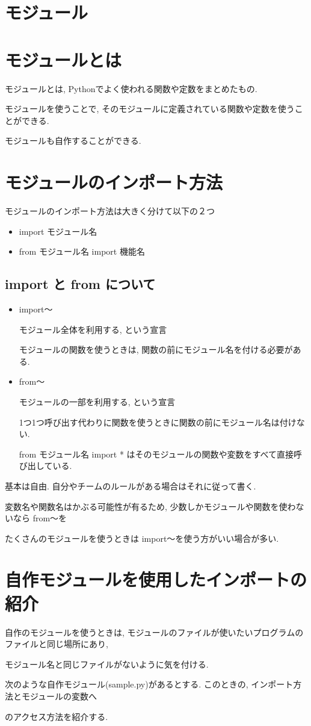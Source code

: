 \documentclass[dvipdfmx]{jsbook}
\newcommand{\countup}[1]{\setcounter{chapter}{#1} \setcounter{section}{0}}
\newcommand{\info}[2]{\begin{tcolorbox}[colframe=gray, colback=black!10!white, coltitle=white, fonttitle=\bfseries, title={#1}]
{#2}\end{tcolorbox}}
\begin{document}
\section*{モジュール}
\countup{10}
\section{モジュールとは}
モジュールとは, Pythonでよく使われる関数や定数をまとめたもの. \par
モジュールを使うことで, そのモジュールに定義されている関数や定数を使うことができる. \par
モジュールも自作することができる.
\section{モジュールのインポート方法}
モジュールのインポート方法は大きく分けて以下の２つ
\begin{itemize}
	\item{import モジュール名}
	\item{from モジュール名 import 機能名}
\end{itemize}
\subsection{import と from について}
\begin{itemize}
	\item{import～} \par
	モジュール全体を利用する, という宣言 \par
	モジュールの関数を使うときは, 関数の前にモジュール名を付ける必要がある.
	\item{from～} \par
	モジュールの一部を利用する, という宣言 \par
	1つ1つ呼び出す代わりに関数を使うときに関数の前にモジュール名は付けない. \par
	from モジュール名 import * はそのモジュールの関数や変数をすべて直接呼び出している.
\end{itemize}

\info{import～と from～の使い分け}{基本は自由. 自分やチームのルールがある場合はそれに従って書く. \par
	変数名や関数名はかぶる可能性が有るため, 少数しかモジュールや関数を使わないなら from～を \par
	たくさんのモジュールを使うときは import～を使う方がいい場合が多い.}

\newpage

\section{自作モジュールを使用したインポートの紹介}
自作のモジュールを使うときは, モジュールのファイルが使いたいプログラムのファイルと同じ場所にあり, \par モジュール名と同じファイルがないように気を付ける.  \par
次のような自作モジュール(sample.py)があるとする. このときの, インポート方法とモジュールの変数へ\par のアクセス方法を紹介する. \par
\end{document}
